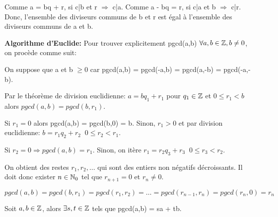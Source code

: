 \begin{demo}
Comme a = bq + r, si c|b et r $\Rightarrow$ c|a.
Comme a - bq = r, si c|a et b $\Rightarrow$ c|r.
Donc, l'ensemble des diviseurs communs de b et r est égal à l'ensemble des diviseurs communs de a et b.
\end{demo}

\hspace{-0.55cm}\textbf{Algorithme d'Euclide:} Pour trouver explicitement pgcd(a,b) $\forall a,b \in \mathbb{Z}, b\neq 0$, on procède comme suit:

On suppose que a et b $\geq 0$ car pgcd(a,b) = pgcd(-a,b) = pgcd(a,-b) = pgcd(-a,-b).

Par le théorème de division euclidienne: $a = bq_1 + r_1$ pour $q_1 \in \mathbb{Z}$ et $0 \leq r_1 < b$ alors $pgcd(a,b) = pgcd(b,r_1)$. 

Si $r_1 = 0$ alors pgcd(a,b) = pgcd(b,0) = b. Sinon, $r_1 > 0$ et par division euclidienne: $b = r_1 q_2 + r_2 \;\; 0 \leq r_2 < r_1$.

Si $r_2 = 0 \Rightarrow pgcd(a,b) = r_1$. Sinon, on itère $r_1 = r_2 q_3 + r_3 \;\; 0 \leq r_3 < r_2$.

On obtient des restes $r_1,r_2,\ldots$ qui sont des entiers non négatifs décroissants. Il doit donc exister $n \in \mathbb{N}_0$ tel que $r_{n+1} = 0$ et $r_n \neq 0$.

$pgcd(a,b) = pgcd(b,r_1) = pgcd(r_1,r_2) = \ldots = pgcd(r_{n-1},r_n) = pgcd(r_n,0) = r_n$

\newpage

\begin{prop}[\textcolor{red}{Identité de Bézout}]
Soit $a,b \in \mathbb{Z}$, alors $\exists s,t \in \mathbb{Z}$ tels que pgcd(a,b) = sa + tb.
\end{prop}


